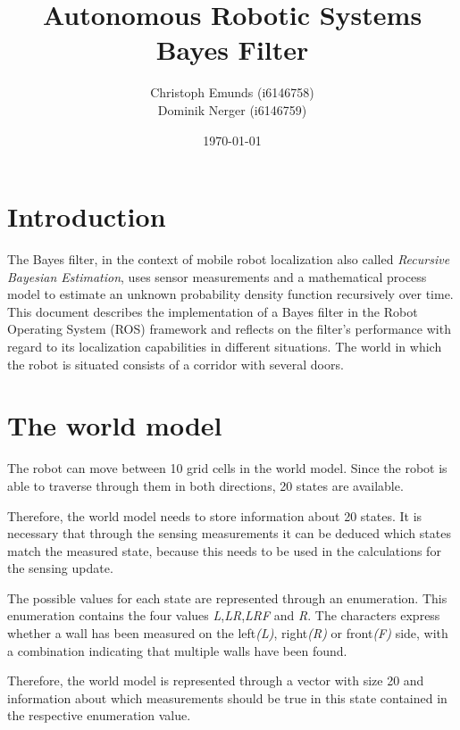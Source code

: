 \documentclass[10pt,a4paper]{article}
\author{Christoph Emunds (i6146758)\\Dominik Nerger (i6146759)}
\title{Autonomous Robotic Systems\\Bayes Filter}
\date{\today}
\begin{document}
	\maketitle
	
	\tableofcontents
	
	\section{Introduction}
	The Bayes filter, in the context of mobile robot localization also called \textit{Recursive Bayesian Estimation}, uses sensor measurements and a mathematical process model to estimate an unknown probability density function recursively over time.	This document describes the implementation of a Bayes filter in the Robot Operating System (ROS) framework and reflects on the filter's performance with regard to its localization capabilities in different situations. The world in which the robot is situated consists of a corridor with several doors.
	
		
	\section{The world model}
	The robot can move between 10 grid cells in the world model. Since the robot is able to traverse through them in both directions, 20 states are available.	
	
	Therefore, the world model needs to store information about 20 states. It is necessary that through the sensing measurements it can be deduced which states match the measured state, because this needs to be used in the calculations for the sensing update.
	
	The possible values for each state are represented through an enumeration. This enumeration contains the four values \textit{L},\textit{LR},\textit{LRF} and \textit{R}. The characters express whether a wall has been measured on the left\textit{(L)}, right\textit{(R)} or front\textit{(F)} side, with a combination indicating that multiple walls have been found.
	
	Therefore, the world model is represented through a vector with size 20 and information about which measurements should be true in this state contained in the respective enumeration value.
	
\end{document}

